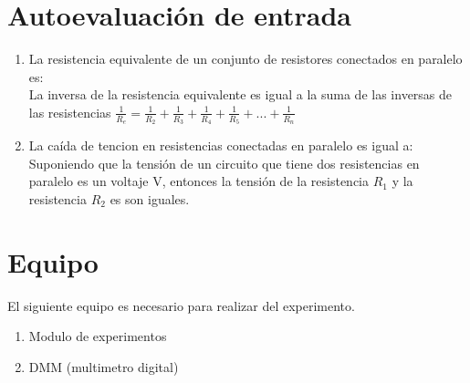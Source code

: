 \section{Autoevaluación de entrada}
\begin{enumerate}
	\item La resistencia equivalente de un conjunto de resistores conectados en paralelo es:
	\\
	La inversa de la resistencia equivalente es igual a la suma de las inversas de las resistencias $\frac{1}{R_{e}} =\frac{1}{R_{2}} + \frac{1}{R_{3}} + \frac{1}{R_{4}} +\frac{1}{R_{5}} + . . . + \frac{1}{R_{n}}$ 
	\item La caída de tencion en resistencias conectadas en paralelo es igual a:
	\\ 
	Suponiendo que la tensión de un circuito que tiene dos resistencias en paralelo es un voltaje V, entonces la tensión de la resistencia $R_{1}$ y la resistencia $R_{2}$ es son iguales.	
\end{enumerate}
\section{Equipo}
El siguiente equipo es necesario para realizar del experimento.
\begin{enumerate}
	\item Modulo de experimentos 
	\item DMM (multimetro digital)
\end{enumerate}

